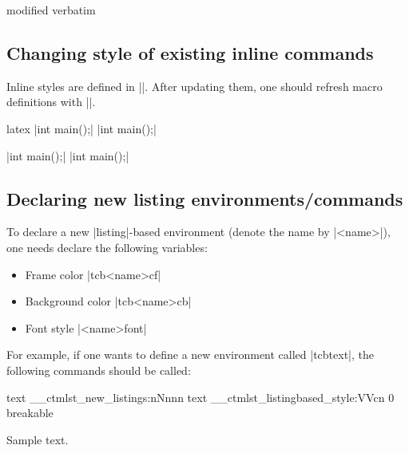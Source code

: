 \documentclass[letterpaper, 11pt, DIV=11]{scrartcl}
\begin{document}
\renewcommand{\tcbverbatimfont}{\linespread{0.9}\fontsize{8}{8}\fontfamily{lmr}}
\begin{tcbverbatim}
modified verbatim
\end{tcbverbatim}



\subsection{Changing style of existing inline commands}

Inline styles are defined in \texinline|\ctmlstinlineoptions|. After updating them, one should refresh macro definitions with \texinline|\ctmlstrenewinline|.
\begin{tcbsrccode}{latex}
\cinline|int main();|
\renewcommand{\ctmlstinlineoptions}{frame=none, fontsize=\fontsize{15}{15}}
\cinline|int main();|
\end{tcbsrccode}

\cinline|int main();|
\renewcommand{\ctmlstinlineoptions}{frame=none, fontsize=\fontsize{15}{15}}
\cinline|int main();|


\subsection{Declaring new listing environments/commands}

To declare a new \rawinline|listing|-based environment (denote the name by \rawinline|<name>|), one needs declare the following variables:

\begin{itemize}
\item Frame color \rawinline|tcb<name>cf|
\item Background color \rawinline|tcb<name>cb|
\item Font style \rawinline|\tcb<name>font|
\end{itemize}

For example, if one wants to define a new environment called \rawinline|tcbtext|, the following commands should be called:

\begin{tcbsrccode}{text}
\newcommand{\tcbtextfont}{\fomtfamily{lmr}\fontsize{10}{10}}
\ExplSyntaxOn
\__ctmlst_new_listings:nNnnn {text} {\__ctmlst_listingbased_style:VVcn} {0} {breakable} {}
\ExplSyntaxOff

\begin{tcbtext}
Sample text.
\end{tcbtext}
\end{tcbsrccode}
\end{document}
